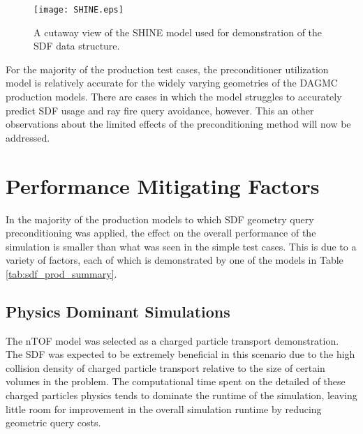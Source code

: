 \begin{figure}
\centering
\texttt{[image: SHINE.eps]}
\caption[A cutaway of the SHINE CAD model.]{A cutaway view of the SHINE model
  used for demonstration of the SDF data structure.}
\label{fig:shine_sdf}
\end{figure}

For the majority of the production test cases, the preconditioner utilization
model is relatively accurate for the widely varying geometries of the DAGMC
production models.  There are cases in which the model struggles to accurately
predict SDF usage and ray fire query avoidance, however. This an other
observations about the limited effects of the preconditioning method will now be
addressed.


\section{Performance Mitigating Factors}\label{sec:sdf_limitations}

In the majority of the production models to which SDF geometry query
preconditioning was applied, the effect on the overall performance of the
simulation is smaller than what was seen in the simple test cases. This is
due to a variety of factors, each of which is demonstrated by one of the models
in Table \ref{tab:sdf_prod_summary}.

\subsection{Physics Dominant Simulations}\label{subsec:sdf_phys_dominant}

The nTOF model was selected as a charged particle transport demonstration. The
SDF was expected to be extremely beneficial in this scenario due to the high
collision density of charged particle transport relative to the size of certain
volumes in the problem. The computational time spent on the detailed of these
charged particles physics tends to dominate the runtime of the simulation,
leaving little room for improvement in the overall simulation runtime by
reducing geometric query costs.

